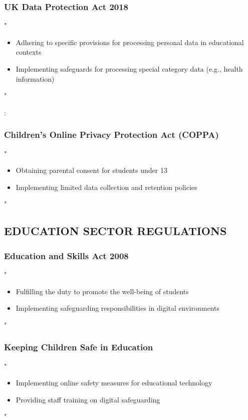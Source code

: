 \documentclass[14pt,a4paper]{article}
\begin{document}
\textit{\parencite{EU2016}}

\subsubsection*{UK Data Protection Act 2018}
"
\begin{itemize}
    \item Adhering to specific provisions for processing personal data in educational contexts
    \item Implementing safeguards for processing special category data (e.g., health information)
\end{itemize}
"

\textit{\parencite{UKGov2018}}:

\subsubsection*{Children's Online Privacy Protection Act (COPPA)}
"
\begin{itemize}
    \item Obtaining parental consent for students under 13
    \item Implementing limited data collection and retention policies
\end{itemize}
"


\textit{\parencite{FTC2023}}

\subsection*{EDUCATION SECTOR REGULATIONS}

\subsubsection*{Education and Skills Act 2008}
"
\begin{itemize}
    \item Fulfilling the duty to promote the well-being of students
    \item Implementing safeguarding responsibilities in digital environments
\end{itemize}
"

\textit{\parencite{UKGov2008}}


\subsubsection*{Keeping Children Safe in Education}
"
\begin{itemize}
    \item Implementing online safety measures for educational technology
    \item Providing staff training on digital safeguarding
\end{itemize}
"
\end{document}
